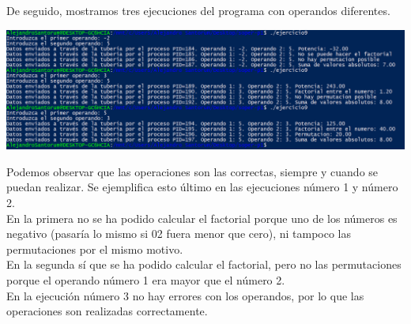 \documentclass[12pt]{article}
\begin{document}
De seguido, mostramos tres ejecuciones del programa con operandos diferentes.
\begin{center}
	\includegraphics[scale=0.75]{ej9.PNG}
\end{center}
Podemos observar que las operaciones son las correctas, siempre y cuando se puedan realizar. Se ejemplifica esto último en las ejecuciones número 1 y número 2.\\ En la primera no se ha podido calcular el factorial porque uno de los números es negativo (pasaría lo mismo si 02 fuera menor que cero), ni tampoco las permutaciones por el mismo motivo.\\ En la segunda sí que se ha podido calcular el factorial, pero no las permutaciones porque el operando número 1 era mayor que el número 2.\\ En la ejecución número 3 no hay errores con los operandos, por lo que las operaciones son realizadas correctamente.
\end{document}
